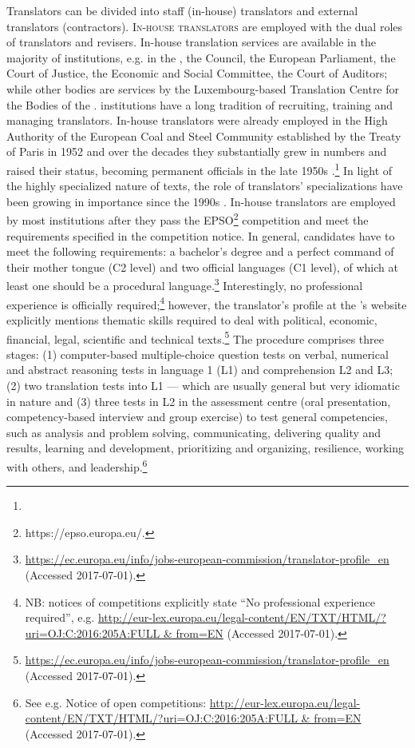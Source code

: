 \documentclass[output=paper]{langsci/langscibook}
\begin{document}
Translators can be divided into staff (in-house) translators and external translators (contractors). \textsc{In-house translators} are employed with the dual roles of translators and revisers. In-house translation services are available in the majority of  institutions, e.g. in the , the Council, the European Parliament, the Court of Justice, the Economic and Social Committee, the Court of Auditors; while other bodies are services by the Luxembourg-based Translation Centre for the Bodies of the .  institutions have a long tradition of recruiting, training and managing translators. In-house translators were already employed in the High Authority of the European Coal and Steel Community established by the Treaty of Paris in 1952 and over the decades they substantially grew in numbers and raised their status, becoming permanent officials in the late 1950s  \citep[18]{European2010}.\footnote{} In light of the highly specialized nature of texts, the role of translators’ specializations have been growing in importance since the 1990s \citep[12, 13]{European2010}. In-house translators are employed by most institutions after they pass the EPSO\footnote{https://epso.europa.eu/.} competition and meet the requirements specified in the competition notice. In general, candidates have to meet the following requirements: a bachelor’s degree and a perfect command of their mother tongue (C2 level) and two official  languages (C1 level), of which at least one should be a procedural language.\footnote{\url{https://ec.europa.eu/info/jobs-european-commission/translator-profile_en} (Accessed 2017-07-01).} Interestingly, no professional experience is officially required;\footnote{NB: notices of competitions explicitly state “No professional experience required”, e.g. \url{http://eur-lex.europa.eu/legal-content/EN/TXT/HTML/?uri=OJ:C:2016:205A:FULL & from=EN} (Accessed 2017-07-01).} however, the translator’s profile at the ’s website explicitly mentions thematic skills required to deal with political, economic, financial, legal, scientific and technical texts.\footnote{\url{https://ec.europa.eu/info/jobs-european-commission/translator-profile_en} (Accessed 2017-07-01).} The procedure comprises three stages: (1) computer-based multiple-choice question tests on verbal, numerical and abstract reasoning tests in language 1 (L1) and comprehension L2 and L3; (2) two translation tests into L1 — which are usually general but very idiomatic in nature and (3) three tests in L2 in the assessment centre (oral presentation, competency-based interview and group exercise) to test general competencies, such as analysis and problem solving, communicating, delivering quality and results, learning and development, prioritizing and organizing, resilience, working with others, and leadership.\footnote{See e.g. Notice of open competitions: \url{http://eur-lex.europa.eu/legal-content/EN/TXT/HTML/?uri=OJ:C:2016:205A:FULL & from=EN} (Accessed 2017-07-01).} 
\end{document}
